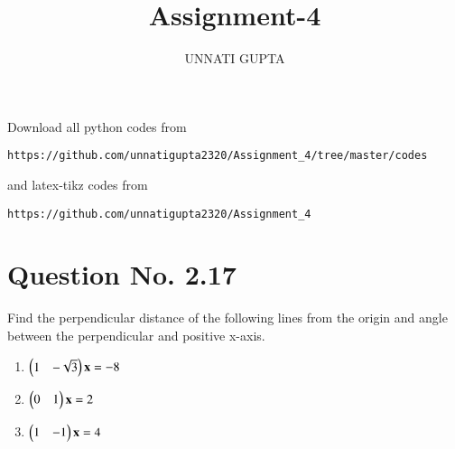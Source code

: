 \documentclass[journal,12pt,twocolumn]{IEEEtran}
\begin{document}
     \def\centbox#1{\makebox[0in]{#1}}
     \def\topbox#1{\raisebox{-\baselineskip}[0in][0in]{#1}}
     \def\midbox#1{\raisebox{-0.5\baselineskip}[0in][0in]{#1}}
\vspace{3cm}
\title{Assignment-4}
\author{UNNATI GUPTA}
\maketitle
\newpage
\bigskip
\renewcommand{\thefigure}{\theenumi}
\renewcommand{\thetable}{\theenumi}
Download all python codes from 
\begin{lstlisting}
https://github.com/unnatigupta2320/Assignment_4/tree/master/codes
\end{lstlisting}
%
and latex-tikz codes from 
%
\begin{lstlisting}
https://github.com/unnatigupta2320/Assignment_4
\end{lstlisting}
%
\section{Question No. 2.17}
Find the perpendicular distance of the following lines from the origin and angle between the perpendicular and positive x-axis.
\begin{enumerate}[label=\alph*.]
    \item  $\begin{pmatrix}1&-\sqrt{3}\end{pmatrix}\mathbf{x} =-8$
    \item  $\begin{pmatrix}0&1\end{pmatrix}\mathbf{x} =2$
    \item $\begin{pmatrix}1&-1\end{pmatrix}\mathbf{x} =4$
\end{enumerate}
%
\end{document}
